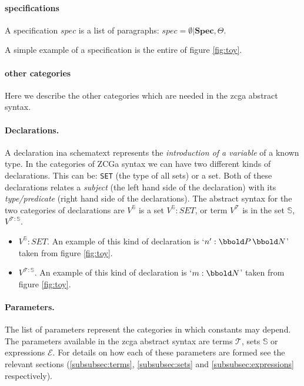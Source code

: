 \paragraph{specifications}
A specification $spec$ is a list of paragraphs: $spec= \emptyset \vert
\mathbf{Spec}, \Theta$.

A simple example of a specification is the entire of figure \ref{fig:toy}.

\paragraph{other categories}

Here we describe the other categories which are needed in the \gls{zcga}
abstract syntax.

\paragraph{Declarations.} A declaration ina schematext represents the
\emph{introduction of a variable} of a known type. In the categories of ZCGa
syntax we can have two different kinds of declarations. This can be:
\texttt{SET} (the type of all sets) or a set. Both of these declarations relates
a \emph{subject} (the left hand side of the declaration) with its
\emph{type/predicate} (right hand side of the declarations). The abstract syntax
for the two categories of declarations are $V^{\mathbb{S}}$ is a set
$V^{\mathbb{S}}:SET$, or term $V^{\mathcal{T}}$ is in the set $\mathbb{S}$,
$V^{\mathcal{T}:\mathbb{S}}$.

\begin{itemize}
\item$V^{\mathbb{S}}:SET$. An example of this kind of declaration is `$n':\power
\nat$' taken from figure \ref{fig:toy}.

\item $V^{\mathcal{T}:\mathbb{S}}$. An example of this kind of declaration is
`$m:\nat$' taken from figure \ref{fig:toy}.
\end{itemize}

\paragraph{Parameters.} The list of parameters represent the categories in which
constants may depend. The parameters available in the \gls{zcga} abstract syntax
are terms $\mathcal{T}$, sets $\mathbb{S}$ or expressions $\mathcal{E}$. For
details on how each of these parameters are formed see the relevant sections
(\ref{subsubsec:terms}, \ref{subsubsec:sets} and \ref{subsubsec:expressions}
respectively).

